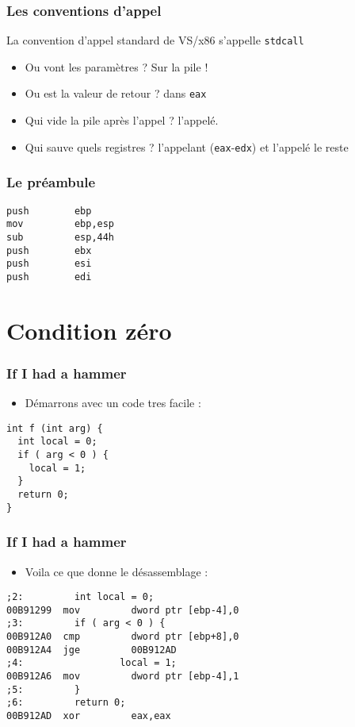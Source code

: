 \documentclass{beamer}
\begin{document}
\begin{frame}
\frametitle{Les conventions d'appel} %
La convention d'appel standard de VS/x86 s'appelle \texttt{stdcall}
\begin{itemize}
\item Ou vont les paramètres ? Sur la pile !
\item Ou est la valeur de retour ? dans \texttt{eax}
\item Qui vide la pile après l'appel ? l'appelé.
\item Qui sauve quels registres ? l'appelant (\texttt{eax}-\texttt{edx}) et l'appelé le reste
\end{itemize}
\end{frame}

\begin{frame}[fragile]
\frametitle{Le préambule} 
\begin{lstlisting}[language={[x86masm]Assembler}, basicstyle={\scriptsize\ttfamily}]
push        ebp  
mov         ebp,esp  
sub         esp,44h  
push        ebx  
push        esi  
push        edi  
\end{lstlisting}
\end{frame}

\section{Condition zéro}
\begin{frame}[fragile]
\frametitle{If I had a hammer}
\begin{itemize}
\item Démarrons avec un code tres facile :
\end{itemize}
\begin{lstlisting}
int f (int arg) {
  int local = 0;
  if ( arg < 0 ) {
    local = 1;
  }
  return 0;
}
\end{lstlisting}
\end{frame}

\begin{frame}[fragile]
\frametitle{If I had a hammer}
\begin{itemize}
\item Voila ce que donne le désassemblage : 
\end{itemize}
\begin{lstlisting}[language={[x86masm]Assembler}]
;2:         int local = 0;
00B91299  mov         dword ptr [ebp-4],0  
;3:         if ( arg < 0 ) {
00B912A0  cmp         dword ptr [ebp+8],0  
00B912A4  jge         00B912AD  
;4:                 local = 1;
00B912A6  mov         dword ptr [ebp-4],1  
;5:         }
;6:         return 0;
00B912AD  xor         eax,eax  
\end{lstlisting}
\end{frame}
\end{document}
